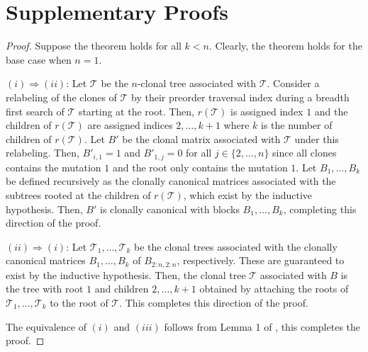 \documentclass[10pt]{article}
\newcommand{\tree}{\mathcal{T}}
\begin{document}
\section{Supplementary Proofs}
\label{sec:supplementary_proofs}
\clonallycanonical*
\begin{proof}
    Suppose the theorem holds for all $k < n$. Clearly, the theorem holds for the base case when $n = 1$.

    $(i) \Rightarrow (ii)$: Let $\tree$ be the $n$-clonal tree associated with $\tree$. Consider a 
    relabeling of the clones of $\tree$ by their preorder traversal index during a breadth first search
    of $\tree$ starting at the root. Then, $r(\tree)$ is assigned index $1$ and the children of $r(\tree)$ 
    are assigned indices $2, \ldots, k + 1$ where $k$ is the number of children of $r(\tree)$. Let $B'$
    be the clonal matrix associated with $\tree$ under this relabeling. Then, $B'_{i,1} = 1$
    and $B'_{1, j} = 0$ for all $j \in \{2, \ldots, n\}$ since all clones contains the mutation $1$ 
    and the root only contains the mutation $1$. Let $B_1, \ldots, B_k$ be defined recursively
    as the clonally canonical matrices associated with the subtrees rooted at the children of $r(\tree)$,
    which exist by the inductive hypothesis. Then, $B'$ is clonally canonical with blocks $B_1, \ldots, B_k$,
    completing this direction of the proof.

    $(ii) \Rightarrow (i)$: Let $\tree_1, \ldots, \tree_k$ be the clonal trees associated with the
    clonally canonical matrices $B_1, \ldots, B_k$ of $B_{2:n, 2:n}$, respectively. These 
    are guaranteed to exist by the inductive hypothesis. Then, the clonal 
    tree $\tree$ associated with $B$ is the tree with root $1$ and children $2, \ldots, k + 1$ obtained
    by attaching the roots of $\tree_1, \ldots, \tree_k$ to the root of $\tree$. This completes
    this direction of the proof.

    The equivalence of $(i)$ and $(iii)$ follows from Lemma 1 of \cite{el-kebir_reconstruction_2015},
    this completes the proof.
\end{proof}
\end{document}
